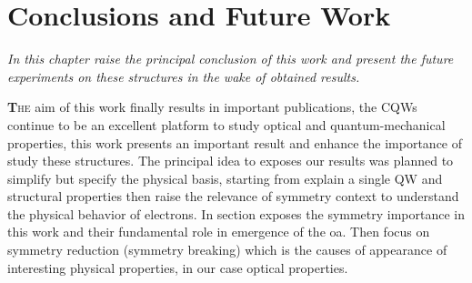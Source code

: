 \chapter{Conclusions and Future Work }
\label{chap:Intro}
\textit{In this chapter raise the principal conclusion of this work and present the future experiments on these structures in the wake of obtained results.}
\vfill
\minitoc
\newpage
\allowdisplaybreaks

\lettrine[lines=3, lraise=.1, nindent=0mm, slope=0mm]{\textbf{T}}{he} aim of this work finally results in important publications, the \gls{CQWs} continue to be an excellent platform to study optical and quantum-mechanical properties, this work presents an important result and enhance the importance of study these structures. The principal idea to exposes our results was planned to simplify but specify the physical basis, starting from explain a single QW and structural properties then raise the relevance of symmetry context to understand the physical behavior of electrons. In section exposes the symmetry importance in this work and their fundamental role in emergence of the \gls{oa}. Then focus on symmetry reduction (symmetry breaking)  which is the causes of appearance  of interesting physical properties, in our case optical properties. 

